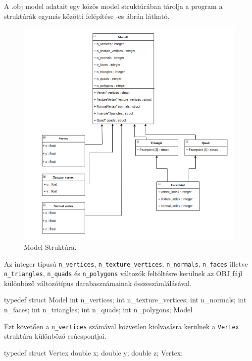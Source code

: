 A .obj model adatait egy közös model struktúrában tárolja a program a struktúrák egymás közötti felépítése -es ábrán látható.
\bigskip
\begin{figure}[h]
\centering
\includegraphics[width=\textwidth]{images/struct.png}
\caption{Model Struktúra.}
\label{fig:struct}
\end{figure}
\bigskip

Az integer típusú \texttt{n\_vertices}, \texttt{n\_texture\_vertices}, \texttt{n\_normals}, \texttt{n\_faces} illetve \texttt{n\_triangles}, \texttt{n\_quads} és \texttt{n\_polygons} változók feltöltésre kerülnek az OBJ fájl különböző változótípus darabasznámainak összeszámlálásával.
\begin{python}
typedef struct Model
{
    int n_vertices;
    int n_texture_vertices;
    int n_normals;
    int n_faces;
    int n_triangles;
    int n_quads;
    int n_polygons;
}Model
\end{python}
\bigskip

Ezt követően a \texttt{n\_vertices} számával közvetlen kiolvasásra kerülnek a \texttt{Vertex} struktúra különböző csúcspontjai.
\begin{python} 
typedef struct Vertex
{
    double x;
    double y;
    double z;
}Vertex;
\end{python}
\bigskip

